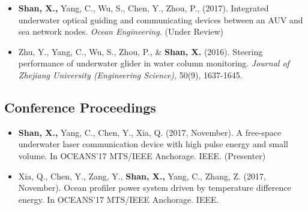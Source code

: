 \documentclass[11pt,a4paper,sans]{moderncv}         %
\begin{document}
\begin{itemize}
        
    \item{\textbf{Shan, X.,} Yang, C., Wu, S., Chen, Y., Zhou, P., (2017). Integrated underwater optical guiding and communicating devices between an AUV and sea network nodes. \textit{Ocean Engineering.} (Under Review)}

    \vspace{3pt}

    \end{itemize}

    \begin{itemize}

    \item{Zhu, Y., Yang, C., Wu, S., Zhou, P., \& \textbf{Shan, X.} (2016). Steering performance of underwater glider in water column monitoring. \textit{Journal of Zhejiang University (Engineering Science)}, 50(9), 1637-1645.}

    \vspace{3pt}

\end{itemize}

\subsection{Conference Proceedings}   

    \begin{itemize}

    \item{\textbf{Shan, X.,}  Yang, C., Chen, Y., Xia, Q. (2017, November). A free-space underwater laser communication device with high pulse energy and small volume. In OCEANS'17 MTS/IEEE Anchorage. IEEE. (Presenter)}

    \vspace{3pt}

    \end{itemize}

    \begin{itemize}
        
    \item{Xia, Q., Chen, Y., Zang, Y., \textbf{Shan, X.,}  Yang, C., Zhang, Z. (2017, November). Ocean profiler power system driven by temperature difference energy. In OCEANS'17 MTS/IEEE Anchorage. IEEE.}

    \vspace{3pt}

\end{itemize}
\end{document}
